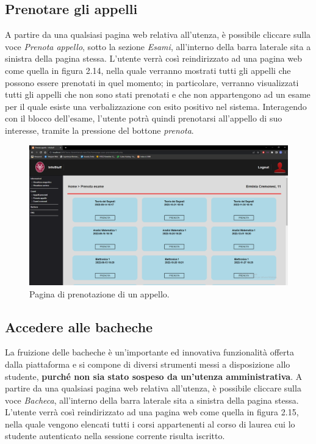 \documentclass [a4paper,11pt]{book}
\begin{document}
\medskip

\subsection{Prenotare gli appelli}

A partire da una qualsiasi pagina web relativa all'utenza, è possibile cliccare sulla voce \emph{Prenota appello}, sotto la sezione \emph{Esami}, all'interno della barra laterale sita a sinistra della pagina stessa. L'utente verrà così reindirizzato ad una pagina web come quella in figura 2.14, nella quale verranno mostrati tutti gli appelli che possono essere prenotati in quel momento; in particolare, verranno visualizzati tutti gli appelli che non sono stati prenotati e che non appartengono ad un esame per il quale esiste una verbalizzazione con esito positivo nel sistema. Interagendo con il blocco dell'esame, l'utente potrà quindi prenotarsi all'appello di suo interesse, tramite la pressione del bottone \emph{prenota}.

\begin{figure}
\centering
\includegraphics[scale=0.3]{figura2-14.png}
\caption{Pagina di prenotazione di un appello.}
\end{figure}

\medskip

\subsection{Accedere alle bacheche}

La fruizione delle bacheche è un'importante ed innovativa funzionalità offerta dalla piattaforma e si compone di diversi strumenti messi a disposizione allo studente, \textbf{purché non sia stato sospeso da un'utenza amministrativa}. A partire da una qualsiasi pagina web relativa all'utenza, è possibile cliccare sulla voce \emph{Bacheca}, all'interno della barra laterale sita a sinistra della pagina stessa. L'utente verrà così reindirizzato ad una pagina web come quella in figura 2.15, nella quale vengono elencati tutti i corsi appartenenti al corso di laurea cui lo studente autenticato nella sessione corrente risulta iscritto.
\end{document}
